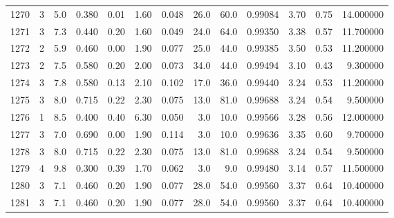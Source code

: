 \begin{tabular}{lrrrrrrrrrrrr}
1270 &        3 &            5.0 &             0.380 &         0.01 &            1.60 &      0.048 &                 26.0 &                  60.0 &  0.99084 &  3.70 &       0.75 &  14.000000 \\
1271 &        3 &            7.3 &             0.440 &         0.20 &            1.60 &      0.049 &                 24.0 &                  64.0 &  0.99350 &  3.38 &       0.57 &  11.700000 \\
1272 &        2 &            5.9 &             0.460 &         0.00 &            1.90 &      0.077 &                 25.0 &                  44.0 &  0.99385 &  3.50 &       0.53 &  11.200000 \\
1273 &        2 &            7.5 &             0.580 &         0.20 &            2.00 &      0.073 &                 34.0 &                  44.0 &  0.99494 &  3.10 &       0.43 &   9.300000 \\
1274 &        3 &            7.8 &             0.580 &         0.13 &            2.10 &      0.102 &                 17.0 &                  36.0 &  0.99440 &  3.24 &       0.53 &  11.200000 \\
1275 &        3 &            8.0 &             0.715 &         0.22 &            2.30 &      0.075 &                 13.0 &                  81.0 &  0.99688 &  3.24 &       0.54 &   9.500000 \\
1276 &        1 &            8.5 &             0.400 &         0.40 &            6.30 &      0.050 &                  3.0 &                  10.0 &  0.99566 &  3.28 &       0.56 &  12.000000 \\
1277 &        3 &            7.0 &             0.690 &         0.00 &            1.90 &      0.114 &                  3.0 &                  10.0 &  0.99636 &  3.35 &       0.60 &   9.700000 \\
1278 &        3 &            8.0 &             0.715 &         0.22 &            2.30 &      0.075 &                 13.0 &                  81.0 &  0.99688 &  3.24 &       0.54 &   9.500000 \\
1279 &        4 &            9.8 &             0.300 &         0.39 &            1.70 &      0.062 &                  3.0 &                   9.0 &  0.99480 &  3.14 &       0.57 &  11.500000 \\
1280 &        3 &            7.1 &             0.460 &         0.20 &            1.90 &      0.077 &                 28.0 &                  54.0 &  0.99560 &  3.37 &       0.64 &  10.400000 \\
1281 &        3 &            7.1 &             0.460 &         0.20 &            1.90 &      0.077 &                 28.0 &                  54.0 &  0.99560 &  3.37 &       0.64 &  10.400000 \\

\end{tabular}
